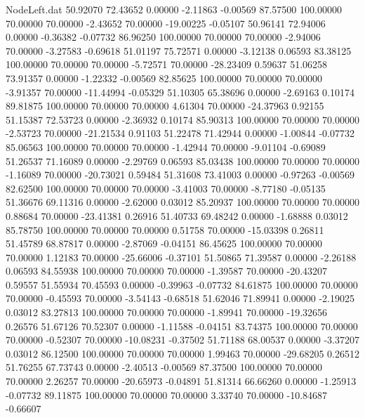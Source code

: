 \begin{filecontents}{NodeLeft.dat}
  50.92070   72.43652    0.00000    -2.11863   -0.00569   87.57500  100.00000   70.00000   70.00000   -2.43652   70.00000  -19.00225   -0.05107
  50.96141   72.94006    0.00000    -0.36382   -0.07732   86.96250  100.00000   70.00000   70.00000   -2.94006   70.00000   -3.27583   -0.69618
  51.01197   75.72571    0.00000    -3.12138    0.06593   83.38125  100.00000   70.00000   70.00000   -5.72571   70.00000  -28.23409    0.59637
  51.06258   73.91357    0.00000    -1.22332   -0.00569   82.85625  100.00000   70.00000   70.00000   -3.91357   70.00000  -11.44994   -0.05329
  51.10305   65.38696    0.00000    -2.69163    0.10174   89.81875  100.00000   70.00000   70.00000    4.61304   70.00000  -24.37963    0.92155
  51.15387   72.53723    0.00000    -2.36932    0.10174   85.90313  100.00000   70.00000   70.00000   -2.53723   70.00000  -21.21534    0.91103
  51.22478   71.42944    0.00000    -1.00844   -0.07732   85.06563  100.00000   70.00000   70.00000   -1.42944   70.00000   -9.01104   -0.69089
  51.26537   71.16089    0.00000    -2.29769    0.06593   85.03438  100.00000   70.00000   70.00000   -1.16089   70.00000  -20.73021    0.59484
  51.31608   73.41003    0.00000    -0.97263   -0.00569   82.62500  100.00000   70.00000   70.00000   -3.41003   70.00000   -8.77180   -0.05135
  51.36676   69.11316    0.00000    -2.62000    0.03012   85.20937  100.00000   70.00000   70.00000    0.88684   70.00000  -23.41381    0.26916
  51.40733   69.48242    0.00000    -1.68888    0.03012   85.78750  100.00000   70.00000   70.00000    0.51758   70.00000  -15.03398    0.26811
  51.45789   68.87817    0.00000    -2.87069   -0.04151   86.45625  100.00000   70.00000   70.00000    1.12183   70.00000  -25.66006   -0.37101
  51.50865   71.39587    0.00000    -2.26188    0.06593   84.55938  100.00000   70.00000   70.00000   -1.39587   70.00000  -20.43207    0.59557
  51.55934   70.45593    0.00000    -0.39963   -0.07732   84.61875  100.00000   70.00000   70.00000   -0.45593   70.00000   -3.54143   -0.68518
  51.62046   71.89941    0.00000    -2.19025    0.03012   83.27813  100.00000   70.00000   70.00000   -1.89941   70.00000  -19.32656    0.26576
  51.67126   70.52307    0.00000    -1.11588   -0.04151   83.74375  100.00000   70.00000   70.00000   -0.52307   70.00000  -10.08231   -0.37502
  51.71188   68.00537    0.00000    -3.37207    0.03012   86.12500  100.00000   70.00000   70.00000    1.99463   70.00000  -29.68205    0.26512
  51.76255   67.73743    0.00000    -2.40513   -0.00569   87.37500  100.00000   70.00000   70.00000    2.26257   70.00000  -20.65973   -0.04891
  51.81314   66.66260    0.00000    -1.25913   -0.07732   89.11875  100.00000   70.00000   70.00000    3.33740   70.00000  -10.84687   -0.66607

\end{filecontents}
